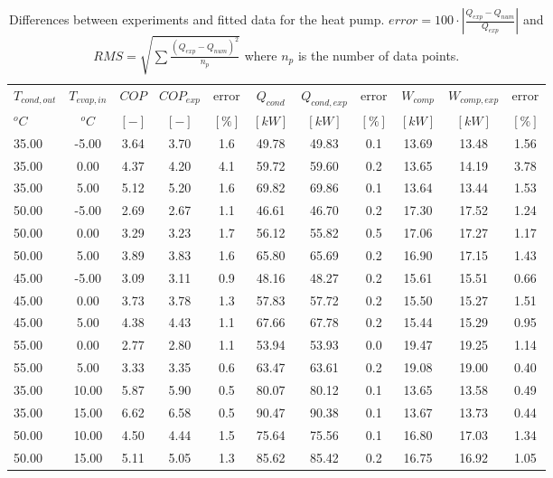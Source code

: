 \documentclass[english]{SPFShortReport}
\begin{document}
\begin{table}[!ht]
\begin{small}
\caption{Differences between experiments and fitted data for the heat pump.          $error=100 \cdot |\frac{Q_{exp}-Q_{num}}{Q_{exp}}|$ and $RMS = \sqrt { \sum{\frac{(Q_{exp}-Q_{num})^2}{n_p}} }$ where $n_p$ is the number of data points.}
\begin{center}
\resizebox{12cm}{!} 
{
\begin{tabular}{l | c c c c c c c c c c } 
\hline
\hline
$T_{cond,out}$ &$T_{evap,in}$ &$COP$ &$COP_{exp}$ &error &$Q_{cond}$ &$Q_{cond,exp}$ &error &$W_{comp}$ &$W_{comp,exp}$ &error \\ 
$^oC$ &$^oC$ &$[-]$ &$[-]$ &$[\%]$ &$[kW]$ &$[kW]$ &$[\%]$ &$[kW]$ &$[kW]$ &$[\%]$\\ 
\hline
35.00  & -5.00 & 3.64 & 3.70 & 1.6 & 49.78 & 49.83 & 0.1 & 13.69 & 13.48 & 1.56\\ 
35.00  & 0.00 & 4.37 & 4.20 & 4.1 & 59.72 & 59.60 & 0.2 & 13.65 & 14.19 & 3.78\\ 
35.00  & 5.00 & 5.12 & 5.20 & 1.6 & 69.82 & 69.86 & 0.1 & 13.64 & 13.44 & 1.53\\ 
50.00  & -5.00 & 2.69 & 2.67 & 1.1 & 46.61 & 46.70 & 0.2 & 17.30 & 17.52 & 1.24\\ 
50.00  & 0.00 & 3.29 & 3.23 & 1.7 & 56.12 & 55.82 & 0.5 & 17.06 & 17.27 & 1.17\\ 
50.00  & 5.00 & 3.89 & 3.83 & 1.6 & 65.80 & 65.69 & 0.2 & 16.90 & 17.15 & 1.43\\ 
45.00  & -5.00 & 3.09 & 3.11 & 0.9 & 48.16 & 48.27 & 0.2 & 15.61 & 15.51 & 0.66\\ 
45.00  & 0.00 & 3.73 & 3.78 & 1.3 & 57.83 & 57.72 & 0.2 & 15.50 & 15.27 & 1.51\\ 
45.00  & 5.00 & 4.38 & 4.43 & 1.1 & 67.66 & 67.78 & 0.2 & 15.44 & 15.29 & 0.95\\ 
55.00  & 0.00 & 2.77 & 2.80 & 1.1 & 53.94 & 53.93 & 0.0 & 19.47 & 19.25 & 1.14\\ 
55.00  & 5.00 & 3.33 & 3.35 & 0.6 & 63.47 & 63.61 & 0.2 & 19.08 & 19.00 & 0.40\\ 
35.00  & 10.00 & 5.87 & 5.90 & 0.5 & 80.07 & 80.12 & 0.1 & 13.65 & 13.58 & 0.49\\ 
35.00  & 15.00 & 6.62 & 6.58 & 0.5 & 90.47 & 90.38 & 0.1 & 13.67 & 13.73 & 0.44\\ 
50.00  & 10.00 & 4.50 & 4.44 & 1.5 & 75.64 & 75.56 & 0.1 & 16.80 & 17.03 & 1.34\\ 
50.00  & 15.00 & 5.11 & 5.05 & 1.3 & 85.62 & 85.42 & 0.2 & 16.75 & 16.92 & 1.05\\ 

\end{tabular}}
\end{center}
\end{small}
\end{table}
\end{document}
